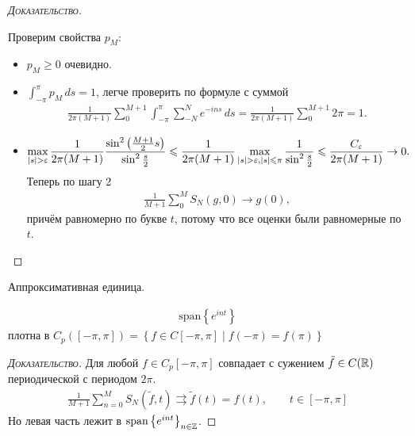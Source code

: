 \documentclass[../complex-analysis.tex]{subfiles}
\begin{document}
\begin{proof}[\normalfont\textsc{Доказательство}]
\begin{enumerate}
 Проверим свойства $ p_M $:
   \begin{itemize}
  \item $ p_M \geqslant 0 $   очевидно.
  \item $ \int_{-\pi}^{\pi} p_M\,ds = 1 $, легче проверить по формуле с суммой
   \begin{align*}
    \frac{1}{2 \pi (M+1)} \sum_{0}^{M+1} \int_{-\pi}^{\pi} \sum_{-N}^{N} e^{-ins}\,ds = \frac{1}{2 \pi (M+1)} \sum_{0}^{M+1} 2\pi = 1.
   \end{align*}
  \item
   \begin{align*}
    \max_{\left| s \right| > \varepsilon} \frac{1}{2\pi(M+1)} \frac{\sin^{2} \left( \frac{M+1}{2} s \right)}{\sin^{2} \frac{s}{2}} \leqslant \frac{1}{2\pi(M+1)} \max_{\left| s \right|  > \varepsilon, \left| s \right| \leqslant \pi} \frac{1}{\sin^{2} \frac{s}{2}} \leqslant \frac{C_\varepsilon}{2\pi (M+1)} \to 0.
   \end{align*} Теперь по шагу 2
   \begin{align*}
    \frac{1}{M+1} \sum_{0}^{M} S_N(g,0) \to g(0),
   \end{align*} причём равномерно по букве $ t $, потому что все оценки были равномерные по $ t $.
 \end{itemize}
 \end{enumerate}
\end{proof}

Аппроксимативная единица.

\begin{crly}
 \begin{align*}
  \mathrm{span} \left\{ e^{int} \right\}
 \end{align*} плотна в $ C_p([-\pi,\pi]) = \left\{ f \in C[-\pi,\pi] \mid f(-\pi) = f(\pi) \right\} $
\end{crly}
\begin{proof}[\normalfont\textsc{Доказательство}]
 Для любой $ f \in C_p [-\pi,\pi] $ совпадает с сужением $ \tilde f \in C(\mathbb{R}) $ периодической с периодом $ 2\pi $.
 \begin{align*}
  \frac{1}{M+1} \sum_{n=0}^{M} S_N(\tilde f, t) \rightrightarrows \tilde f(t) = f(t), \qquad t \in [-\pi,\pi]
 \end{align*} Но левая часть лежит в $ \mathrm{span} \left\{ e^{int} \right\}_{n \in \mathbb{Z}} $.
\end{proof}
\end{document}
